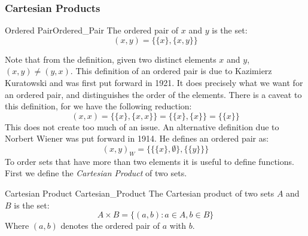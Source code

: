 \documentclass[crop=false,class=book,oneside]{standalone}
\begin{document}
            \subsubsection{Cartesian Products}
                \begin{ldefinition}{Ordered Pair}{Ordered_Pair}
                    The \gls{ordered pair} of $x$ and $y$ is the set:
                    \begin{equation}
                        (x,y)=\big\{\{x\},\{x,y\}\big\}
                    \end{equation}
                \end{ldefinition}
                Note that from the definition, given two distinct
                elements $x$ and $y$, $(x,y)\ne(y,x)$. This
                definition of an ordered pair is due to Kazimierz
                Kuratowski and was first put forward in 1921. It
                does precisely what we want for an ordered pair,
                and distinguishes the order of the elements. There
                is a caveat to this definition, for we have the
                following reduction:
                \begin{equation}
                    (x,x)=\big\{\{x\},\{x,x\}\big\}
                    =\big\{\{x\},\{x\}\big\}
                    =\big\{\{x\}\big\}
                \end{equation}
                This does not create too much of an issue. An
                alternative definition due to Norbert Wiener was put
                forward in 1914. He defines an ordered pair as:
                \begin{equation}
                    (x,y)_{W}=\Big\{\big\{\{x\},\emptyset\big\},
                        \big\{\{y\}\big\}\Big\}
                \end{equation}
                To order sets that have more than two elements it is
                useful to define functions. First we define the
                \textit{Cartesian Product} of two sets.
                \begin{ldefinition}{Cartesian Product}
                      {Cartesian_Product}
                    The \gls{Cartesian product} of two sets $A$
                    and $B$ is the set:
                    \begin{equation}
                        A\times{B}=\{(a,b):a\in{A},b\in{B}\}
                    \end{equation}
                    Where $(a,b)$ denotes the ordered pair of
                    $a$ with $b$.
                \end{ldefinition}
\end{document}
